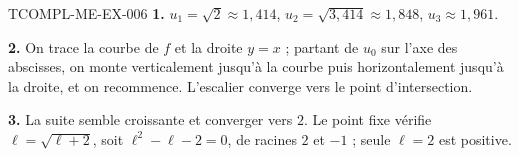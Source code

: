 \begin{corrige}{TCOMPL-ME-EX-006}
\textbf{1.} $u_1=\sqrt2\approx1{,}414$, $u_2=\sqrt{3{,}414}\approx1{,}848$,
$u_3\approx1{,}961$.

\textbf{2.} On trace la courbe de $f$ et la droite $y=x$ ; partant de $u_0$
sur l'axe des abscisses, on monte verticalement jusqu'à la courbe puis
horizontalement jusqu'à la droite, et on recommence. L'escalier converge vers
le point d'intersection.

\textbf{3.} La suite semble croissante et converger vers $2$. Le point fixe
vérifie $\ell=\sqrt{\ell+2}$, soit $\ell^2-\ell-2=0$, de racines $2$ et $-1$ ;
seule $\ell=2$ est positive.
\end{corrige}

